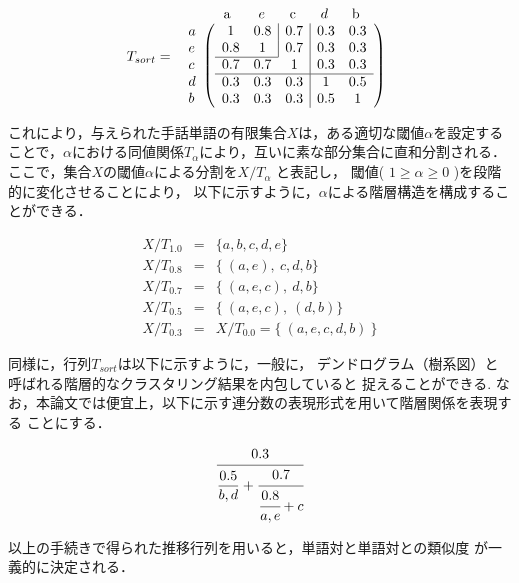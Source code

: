 \[ T_{sort} = 
\begin{array}{r@{}l}
& \begin{array}{ccccc}
\makebox[2.5em]{a}& e& \makebox[2.0em]{c}& d& \makebox[2.0em]{b}
\end{array}\\
\begin{array}{l}
a\\ e\\ c\\ d\\ b
\end{array} &
\left(
 \begin{array}{ccc|cc}
1   & \multicolumn{1}{c|}{0.8} & 0.7 & 0.3 & 0.3 \\
0.8 & \multicolumn{1}{c|}{1} & 0.7 & 0.3 & 0.3 \\ \cline{1-2}
0.7 & 0.7 & 1 & 0.3 & 0.3 \\ \hline
0.3 & 0.3 & 0.3 & 1 & 0.5 \\
0.3 & 0.3 & 0.3 & 0.5 & 1
\end{array}
\right)
\end{array}
\]

これにより，与えられた手話単語の有限集合$X$は，ある適切な閾値$\alpha$を設定する
ことで，$\alpha$における同値関係$T_{\alpha}$により，互いに素な部分集合に直和分割される．
ここで，集合$X$の閾値$\alpha$による分割を$X/T_{\alpha}$ と表記し，
閾値( $1 \ge \alpha \ge 0$ )を段階的に変化させることにより，
以下に示すように，$\alpha$による階層構造を構成することができる．

\begin{eqnarray*}
X/T_{1.0} &=& \{a, b, c, d, e \} \\
X/T_{0.8} &=& \{ \ (a, e), \ c, d, b \} \\
X/T_{0.7} &=& \{ \ (a, e, c), \ d, b \} \\
X/T_{0.5} &=& \{ \ (a, e, c), \ (d, b) \} \\
X/T_{0.3} &=& X/T_{0.0} = \{ \ (a, e, c, d, b)\  \}
\end{eqnarray*}

同様に，行列$T_{sort}$は以下に示すように，一般に，
デンドログラム（樹系図）と呼ばれる階層的なクラスタリング結果を内包していると
捉えることができる.
なお，本論文では便宜上，以下に示す連分数の表現形式を用いて階層関係を表現する
ことにする．

\[
\cfrac{0.3}{\dfrac{0.5}{b,d} + \cfrac{0.7}{\cfrac{0.8}{a,e} + c}}
\]

以上の手続きで得られた推移行列を用いると，単語対と単語対との類似度
が一義的に決定される．


